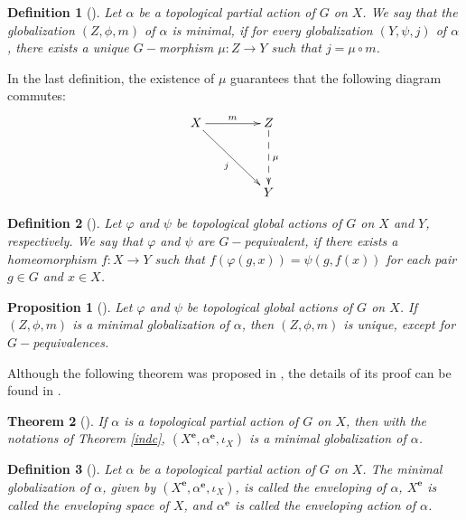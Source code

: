 \documentclass[sn-mathphys-num]{sn-jnl}%
\theoremstyle{thmstyleone}%
\newtheorem{theorem}{Theorem}%
\newtheorem{proposition}[theorem]{Proposition}%
\theoremstyle{thmstyletwo}%
\theoremstyle{thmstylethree}%
\newtheorem{definition}{Definition}%
\begin{document}
\begin{definition}[\cite{Avila-Molina}]
Let $ \alpha $ be a topological partial action  of $ G $ on $ X $. We say that the globalization $ (Z, \phi, m) $ of $ \alpha $ is minimal, if for every globalization $ (Y, \psi, j) $ of $ \alpha $, there exists a unique $ G-$morphism $ \mu: Z \to Y $ such that $ j = \mu \circ m $.\\
\end{definition}
In the last definition, the existence of $ \mu $ guarantees that the following diagram commutes:
$$
\xymatrix@=1.5cm{
X \ar[dr]_j \ar[r]^m & Z\ar@{-->}[d]^{\mu}\\
& Y
}
$$


\begin{definition}[\cite{Avila-Molina}]
Let $ \varphi $ and $ \psi $ be topological global actions of $ G $ on $ X $ and $ Y$, respectively. We say that $ \varphi $ and $ \psi $ are $G-$pequivalent, if there exists a homeomorphism $ f: X \to Y $  such that $f(\varphi(g,x))=\psi(g,f(x))$ for each pair $g\in G$ and $x\in X$.\\
\end{definition}



\begin{proposition}[\cite{Avila-Molina}]\label{uni}
Let $ \varphi $ and $ \psi $ be topological global actions of $ G $ on $ X $. If $ (Z, \phi, m) $ is a minimal globalization of $ \alpha $, then $ (Z, \phi, m)$  is unique, except for $G-$pequivalences.\\
\end{proposition}

Although the following theorem was proposed in \cite{Abadie2}, the details of
its proof can be found in \cite{Avila-Molina}.\\

\begin{theorem}[\cite{Abadie2}]\label{Teo4}
If $ \alpha $ is a  topological partial action of $ G $ on $ X $, then with the notations of Theorem \ref{indc}, $ (X^\mathbf{e}, \alpha^\mathbf{e}, \iota_X) $ is a minimal globalization of $ \alpha $.\\
\end{theorem}

\begin{definition}[\cite{Abadie2}]
Let $ \alpha $ be a topological partial  action of $ G $ on $ X $. The minimal  globalization of $\alpha$,  given by $ (X^\mathbf{e}, \alpha^\mathbf{e}, \iota_X)$,  is called the enveloping  of $ \alpha $, $X^\mathbf{e}$ is  called the enveloping space of $X$, and $\alpha^\mathbf{e}$ is called the enveloping action of $\alpha$.\\
\end{definition}
\end{document}

